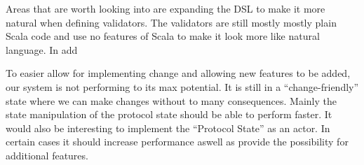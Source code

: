 Areas that are worth looking into are expanding the DSL to make it more natural when defining validators. The validators are still mostly mostly plain Scala code and use no features of Scala to make it look more like natural language. In add

To easier allow for implementing change and allowing new features to be added, our system is not performing to its max potential. It is still in a ``change-friendly'' state where we can make changes without to many consequences. Mainly the state manipulation of the protocol state should be able to perform faster. It would also be interesting to implement the ``Protocol State'' as an actor. In certain cases it should increase performance aswell as provide the possibility for additional features.


